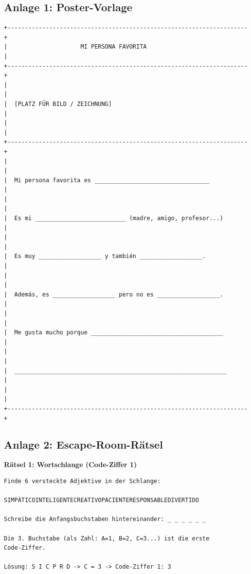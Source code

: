 \documentclass[11pt,a4paper]{article}
\begin{document}
\subsection{Anlage 1: Poster-Vorlage}

\begin{verbatim}
+---------------------------------------------------------------------+
|                     MI PERSONA FAVORITA                              |
+---------------------------------------------------------------------+
|                                                                     |
|  [PLATZ FÜR BILD / ZEICHNUNG]                                       |
|                                                                     |
+---------------------------------------------------------------------+
|                                                                     |
|  Mi persona favorita es _________________________________           |
|                                                                     |
|  Es mi __________________________ (madre, amigo, profesor...)       |
|                                                                     |
|  Es muy __________________ y también __________________.            |
|                                                                     |
|  Además, es __________________ pero no es __________________.       |
|                                                                     |
|  Me gusta mucho porque ______________________________________       |
|                                                                     |
|  _____________________________________________________________      |
|                                                                     |
+---------------------------------------------------------------------+
\end{verbatim}

\subsection{Anlage 2: Escape-Room-Rätsel}

\textbf{Rätsel 1: Wortschlange (Code-Ziffer 1)}

\begin{verbatim}
Finde 6 versteckte Adjektive in der Schlange:

SIMPÁTICOINTELIGENTECREATIVOPACIENTERESPONSABLEDIVERTIDO

Schreibe die Anfangsbuchstaben hintereinander: _ _ _ _ _ _

Die 3. Buchstabe (als Zahl: A=1, B=2, C=3...) ist die erste
Code-Ziffer.

Lösung: S I C P R D -> C = 3 -> Code-Ziffer 1: 3
\end{verbatim}
\end{document}
